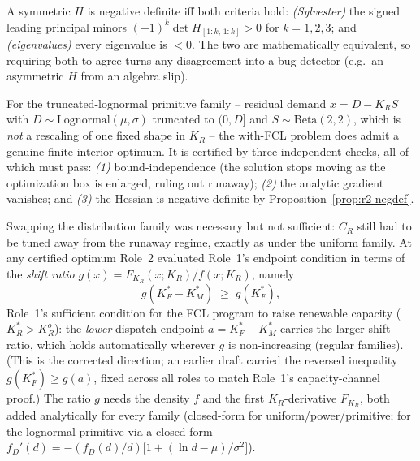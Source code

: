 \begin{proposition}
\label{prop:r2-negdef}
A symmetric $H$ is negative definite iff both criteria hold: \emph{(Sylvester)}
the signed leading principal minors $(-1)^{k}\det H_{[1:k,\,1:k]}>0$ for
$k=1,2,3$; and \emph{(eigenvalues)} every eigenvalue is $<0$. The two are
mathematically equivalent, so requiring both to agree turns any disagreement into
a bug detector (e.g.\ an asymmetric $H$ from an algebra slip).
\end{proposition}

\begin{proposition}
\label{prop:r2-finite-opt}
For the truncated-lognormal primitive family -- residual demand $x=D-K_R S$ with
$D\sim\mathrm{Lognormal}(\mu,\sigma)$ truncated to $(0,\bar D]$ and
$S\sim\mathrm{Beta}(2,2)$, which is \emph{not} a rescaling of one fixed shape in
$K_R$ -- the with-FCL problem does admit a genuine finite interior optimum. It is
certified by three independent checks, all of which must pass: \emph{(1)}
bound-independence (the solution stops moving as the optimization box is
enlarged, ruling out runaway); \emph{(2)} the analytic gradient vanishes; and
\emph{(3)} the Hessian is negative definite by
Proposition~\ref{prop:r2-negdef}.
\end{proposition}

Swapping the distribution family was necessary but not sufficient: $C_R$ still
had to be tuned away from the runaway regime, exactly as under the uniform
family. At any certified optimum Role~2 evaluated Role~1's endpoint condition in
terms of the \emph{shift ratio} $g(x)=F_{K_R}(x;K_R)/f(x;K_R)$, namely
\begin{equation}
\label{eq:r2-shiftratio}
g(K_F^{*}-K_M^{*}) \;\ge\; g(K_F^{*}),
\end{equation}
Role~1's sufficient condition for the FCL program to raise renewable capacity
($K_R^{*}>K_R^{o}$): the \emph{lower} dispatch endpoint $a=K_F^{*}-K_M^{*}$
carries the larger shift ratio, which holds automatically wherever $g$ is
non-increasing (regular families). \textup{(}This is the corrected direction;
an earlier draft carried the reversed inequality $g(K_F^{*})\ge g(a)$, fixed
across all roles to match Role~1's capacity-channel proof.\textup{)}
The ratio $g$ needs the density $f$ and the first
$K_R$-derivative $F_{K_R}$, both added analytically for every family (closed-form
for uniform/power/primitive; for the lognormal primitive via a closed-form
$f_D'(d)=-(f_D(d)/d)\bigl[1+(\ln d-\mu)/\sigma^{2}\bigr]$).

